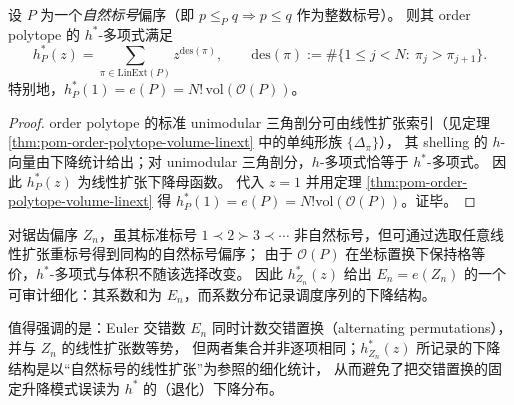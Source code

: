 \begin{theorem}\label{thm:pom-hstar-descent-linext}
设 \(P\) 为一个\emph{自然标号}偏序（即 \(p\le_P q \Rightarrow p\le q\) 作为整数标号）。
则其 order polytope 的 \(h^*\)-多项式满足
\[
h_P^*(z)=\sum_{\pi\in\mathrm{LinExt}(P)} z^{\mathrm{des}(\pi)},
\qquad
\mathrm{des}(\pi):=\#\{1\le j<N:\ \pi_j>\pi_{j+1}\}.
\]
特别地，\(h_P^*(1)=e(P)=N!\,\mathrm{vol}(\mathcal O(P))\)。
\end{theorem}
\begin{proof}
order polytope 的标准 unimodular 三角剖分可由线性扩张索引（见定理 \ref{thm:pom-order-polytope-volume-linext} 中的单纯形族 \(\{\Delta_\pi\}\)），
其 shelling 的 \(h\)-向量由下降统计给出；对 unimodular 三角剖分，\(h\)-多项式恰等于 \(h^*\)-多项式。
因此 \(h_P^*(z)\) 为线性扩张下降母函数。
代入 \(z=1\) 并用定理 \ref{thm:pom-order-polytope-volume-linext} 得 \(h_P^*(1)=e(P)=N!\mathrm{vol}(\mathcal O(P))\)。证毕。
\end{proof}

\begin{remark}\label{rem:pom-fence-hstar-refinement}
对锯齿偏序 \(Z_n\)，虽其标准标号 \(1\prec 2\succ 3\prec\cdots\) 非自然标号，但可通过选取任意线性扩张重标号得到同构的自然标号偏序；
由于 \(\mathcal O(P)\) 在坐标置换下保持格等价，\(h^*\)-多项式与体积不随该选择改变。
因此 \(h_{Z_n}^*(z)\) 给出 \(E_n=e(Z_n)\) 的一个可审计细化：其系数和为 \(E_n\)，而系数分布记录调度序列的下降结构。
\par
值得强调的是：Euler 交错数 \(E_n\) 同时计数交错置换（alternating permutations），并与 \(Z_n\) 的线性扩张数等势，
但两者集合并非逐项相同；\(h_{Z_n}^*(z)\) 所记录的下降结构是以“自然标号的线性扩张”为参照的细化统计，
从而避免了把交错置换的固定升降模式误读为 \(h^*\) 的（退化）下降分布。
\end{remark}


